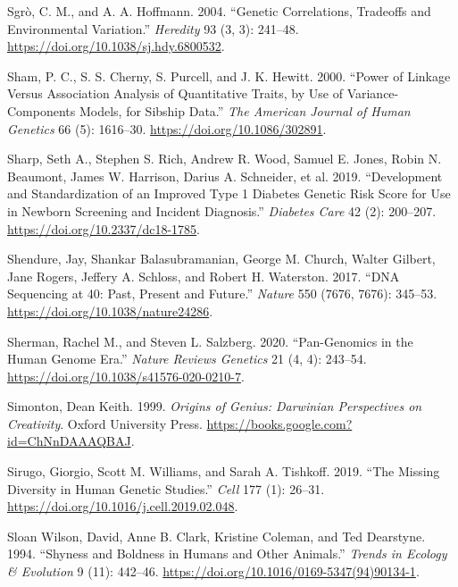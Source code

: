 \documentclass[
]{book}
\newlength{\cslhangindent}
\newlength{\cslentryspacingunit} %
\newenvironment{CSLReferences}[2] %
 {%
  \setlength{\parindent}{0pt}
  \ifodd #1
  \let\oldpar\par
  \def\par{\hangindent=\cslhangindent\oldpar}
  \fi
  \setlength{\parskip}{#2\cslentryspacingunit}
 }%
 {}
\begin{document}
\begin{CSLReferences}{1}{0}
\leavevmode{}%
Sgrò, C. M., and A. A. Hoffmann. 2004. {``Genetic Correlations, Tradeoffs and Environmental Variation.''} \emph{Heredity} 93 (3, 3): 241--48. \url{https://doi.org/10.1038/sj.hdy.6800532}.

\leavevmode{}%
Sham, P. C., S. S. Cherny, S. Purcell, and J. K. Hewitt. 2000. {``Power of {Linkage} Versus {Association Analysis} of {Quantitative Traits}, by {Use} of {Variance-Components Models}, for {Sibship Data}.''} \emph{The American Journal of Human Genetics} 66 (5): 1616--30. \url{https://doi.org/10.1086/302891}.

\leavevmode{}%
Sharp, Seth A., Stephen S. Rich, Andrew R. Wood, Samuel E. Jones, Robin N. Beaumont, James W. Harrison, Darius A. Schneider, et al. 2019. {``Development and {Standardization} of an {Improved Type} 1 {Diabetes Genetic Risk Score} for {Use} in {Newborn Screening} and {Incident Diagnosis}.''} \emph{Diabetes Care} 42 (2): 200--207. \url{https://doi.org/10.2337/dc18-1785}.

\leavevmode{}%
Shendure, Jay, Shankar Balasubramanian, George M. Church, Walter Gilbert, Jane Rogers, Jeffery A. Schloss, and Robert H. Waterston. 2017. {``{DNA} Sequencing at 40: Past, Present and Future.''} \emph{Nature} 550 (7676, 7676): 345--53. \url{https://doi.org/10.1038/nature24286}.

\leavevmode{}%
Sherman, Rachel M., and Steven L. Salzberg. 2020. {``Pan-Genomics in the Human Genome Era.''} \emph{Nature Reviews Genetics} 21 (4, 4): 243--54. \url{https://doi.org/10.1038/s41576-020-0210-7}.

\leavevmode{}%
Simonton, Dean Keith. 1999. \emph{Origins of {Genius}: {Darwinian Perspectives} on {Creativity}}. {Oxford University Press}. \url{https://books.google.com?id=ChNnDAAAQBAJ}.

\leavevmode{}%
Sirugo, Giorgio, Scott M. Williams, and Sarah A. Tishkoff. 2019. {``The {Missing Diversity} in {Human Genetic Studies}.''} \emph{Cell} 177 (1): 26--31. \url{https://doi.org/10.1016/j.cell.2019.02.048}.

\leavevmode{}%
Sloan Wilson, David, Anne B. Clark, Kristine Coleman, and Ted Dearstyne. 1994. {``Shyness and Boldness in Humans and Other Animals.''} \emph{Trends in Ecology \& Evolution} 9 (11): 442--46. \url{https://doi.org/10.1016/0169-5347(94)90134-1}.


\end{CSLReferences}
\end{document}
